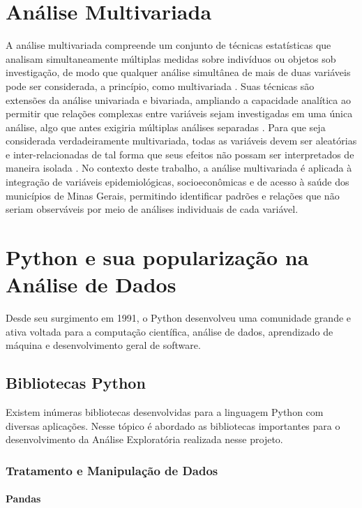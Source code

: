 \section{Análise Multivariada}
A análise multivariada compreende um conjunto de técnicas estatísticas que analisam simultaneamente múltiplas medidas sobre indivíduos ou objetos sob investigação, de modo que qualquer análise simultânea de mais de duas variáveis pode ser considerada, a princípio, como multivariada \cite{hair2009}. Suas técnicas são extensões da análise univariada e bivariada, ampliando a capacidade analítica ao permitir que relações complexas entre variáveis sejam investigadas em uma única análise, algo que antes exigiria múltiplas análises separadas \cite{hair2009}. Para que seja considerada verdadeiramente multivariada, todas as variáveis devem ser aleatórias e inter-relacionadas de tal forma que seus efeitos não possam ser interpretados de maneira isolada \cite{hair2009}. No contexto deste trabalho, a análise multivariada é aplicada à integração de variáveis epidemiológicas, socioeconômicas e de acesso à saúde dos municípios de Minas Gerais, permitindo identificar padrões e relações que não seriam observáveis por meio de análises individuais de cada variável.

\section{Python e sua popularização na Análise de Dados}

 Desde seu surgimento em 1991, o Python desenvolveu uma comunidade grande e ativa voltada para a computação científica, análise de dados, aprendizado de máquina e desenvolvimento geral de software. \cite{mckinney2022python}


\subsection{Bibliotecas Python}
Existem inúmeras bibliotecas desenvolvidas para a linguagem Python com diversas
aplicações. Nesse tópico é abordado as bibliotecas importantes para o desenvolvimento da
Análise Exploratória realizada nesse projeto.

\subsubsection{Tratamento e Manipulação de Dados}

\paragraph{Pandas} 

